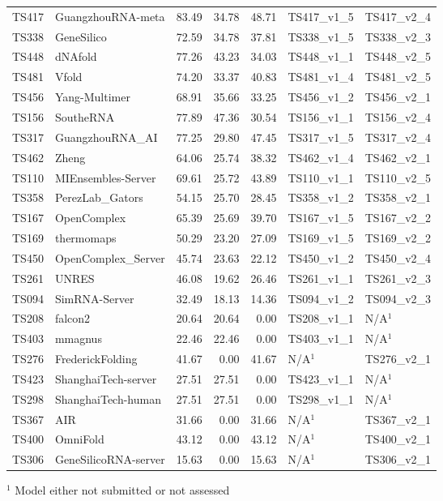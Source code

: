 \begin{table}[ht]
{\begin{tabular}{llrrrll}
TS417 & GuangzhouRNA-meta & 83.49 & 34.78 & 48.71 & TS417\_v1\_5 & TS417\_v2\_4 \\ 
TS338 & GeneSilico & 72.59 & 34.78 & 37.81 & TS338\_v1\_5 & TS338\_v2\_3 \\ 
TS448 & dNAfold & 77.26 & 43.23 & 34.03 & TS448\_v1\_1 & TS448\_v2\_5 \\ 
TS481 & Vfold & 74.20 & 33.37 & 40.83 & TS481\_v1\_4 & TS481\_v2\_5 \\ 
TS456 & Yang-Multimer & 68.91 & 35.66 & 33.25 & TS456\_v1\_2 & TS456\_v2\_1 \\ 
TS156 & SoutheRNA & 77.89 & 47.36 & 30.54 & TS156\_v1\_1 & TS156\_v2\_4 \\ 
TS317 & GuangzhouRNA\_AI & 77.25 & 29.80 & 47.45 & TS317\_v1\_5 & TS317\_v2\_4 \\ 
TS462 & Zheng & 64.06 & 25.74 & 38.32 & TS462\_v1\_4 & TS462\_v2\_1 \\ 
TS110 & MIEnsembles-Server & 69.61 & 25.72 & 43.89 & TS110\_v1\_1 & TS110\_v2\_5 \\ 
TS358 & PerezLab\_Gators & 54.15 & 25.70 & 28.45 & TS358\_v1\_2 & TS358\_v2\_1 \\ 
TS167 & OpenComplex & 65.39 & 25.69 & 39.70 & TS167\_v1\_5 & TS167\_v2\_2 \\ 
TS169 & thermomaps & 50.29 & 23.20 & 27.09 & TS169\_v1\_5 & TS169\_v2\_2 \\ 
TS450 & OpenComplex\_Server & 45.74 & 23.63 & 22.12 & TS450\_v1\_2 & TS450\_v2\_4 \\ 
TS261 & UNRES & 46.08 & 19.62 & 26.46 & TS261\_v1\_1 & TS261\_v2\_3 \\ 
TS094 & SimRNA-Server & 32.49 & 18.13 & 14.36 & TS094\_v1\_2 & TS094\_v2\_3 \\ 
TS208 & falcon2 & 20.64 & 20.64 & 0.00 & TS208\_v1\_1 & N/A$^{1}$ \\ 
TS403 & mmagnus & 22.46 & 22.46 & 0.00 & TS403\_v1\_1 & N/A$^{1}$ \\ 
TS276 & FrederickFolding & 41.67 & 0.00 & 41.67 & N/A$^{1}$ & TS276\_v2\_1 \\ 
TS423 & ShanghaiTech-server & 27.51 & 27.51 & 0.00 & TS423\_v1\_1 & N/A$^{1}$ \\ 
TS298 & ShanghaiTech-human & 27.51 & 27.51 & 0.00 & TS298\_v1\_1 & N/A$^{1}$ \\ 
TS367 & AIR & 31.66 & 0.00 & 31.66 & N/A$^{1}$ & TS367\_v2\_1 \\ 
TS400 & OmniFold & 43.12 & 0.00 & 43.12 & N/A$^{1}$ & TS400\_v2\_1 \\ 
TS306 & GeneSilicoRNA-server & 15.63 & 0.00 & 15.63 & N/A$^{1}$ & TS306\_v2\_1 \\ 
\bottomrule
\end{tabular}%
}
\begin{flushleft}\footnotesize $^{1}$ Model either not submitted or not assessed\end{flushleft}
\end{table}
